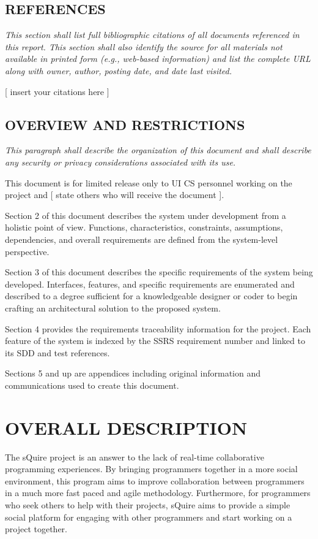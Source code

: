 \documentclass[twoside,letterpaper]{article}
\begin{document}
\subsection[REFERENCES]{\rmfamily\bfseries REFERENCES}
\hypertarget{RefHeading16659017292}{}{\itshape
This section shall list full bibliographic citations of all
documents referenced in this report. This section shall also
identify the source for all materials not available in printed
form (e.g., web-based information) and list the
complete URL along with owner, author, posting date, and date last visited.}

{
[ insert your citations here ]}

\subsection[OVERVIEW AND RESTRICTIONS]{\rmfamily\bfseries OVERVIEW AND
RESTRICTIONS}
\hypertarget{RefHeading16859017292}{}{\itshape
This paragraph shall describe the organization of this document
and shall describe any security or privacy
considerations associated with its use.}

{
This document is for limited release only to UI CS personnel working
on the project and [ state others who will receive
the document ].}


\bigskip

{
Section 2 of this document describes the system under development
from a holistic point of view. Functions,
characteristics, constraints, assumptions, dependencies, and overall
requirements are defined from the system-level perspective.}


\bigskip

{
Section 3 of this document describes the specific requirements of
the system being developed. Interfaces, features, and specific
requirements are enumerated and described to a degree sufficient
for a knowledgeable designer or coder to
begin crafting an architectural solution to the proposed system.}


\bigskip

{
Section 4 provides the requirements traceability information for the
project. Each feature of the system is indexed by
the SSRS requirement number and linked to its SDD and test references.}


\bigskip

{
Sections 5 and up are appendices including original information and
communications used to create this document.}

\clearpage\section[OVERALL DESCRIPTION]{\rmfamily\bfseries OVERALL DESCRIPTION}
\hypertarget{RefHeading17059017292}{}{
{The sQuire project is an answer to the lack of real-time collaborative programming experiences. By bringing programmers together in a more social environment, this program aims to improve collaboration between programmers in a much more fast paced and agile methodology. Furthermore, for programmers who seek others to help with their projects, sQuire aims to provide a simple social platform for engaging with other programmers and start working on a project together.}}
\end{document}
